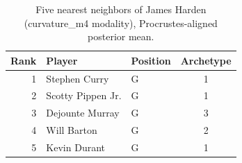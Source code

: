 \begin{table}[htbp]
  \centering\small
  \begin{tabular}{rllc}
    \toprule
    Rank & Player & Position & Archetype \\
    \midrule
    1 & Stephen Curry & G & 1 \\
    2 & Scotty Pippen Jr. & G & 1 \\
    3 & Dejounte Murray & G & 3 \\
    4 & Will Barton & G & 2 \\
    5 & Kevin Durant & G & 1 \\
    \bottomrule
  \end{tabular}
  \caption{Five nearest neighbors of James Harden (curvature_m4 modality), Procrustes-aligned posterior mean.}
  \label{tab:James_Harden_neighbors_curvature_m4}
\end{table}

